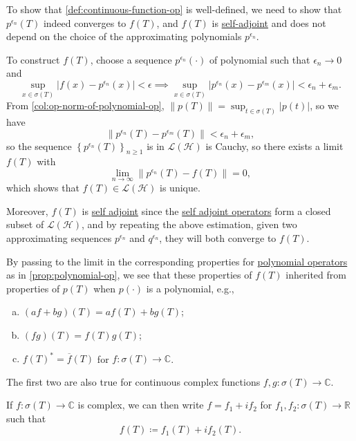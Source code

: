 \begin{note}
	To show that \autoref{def:continuous-function-op} is well-defined, we need to show that \(p^{\epsilon _n}(T)\) indeed converges to \(f(T)\), and \(f(T)\) is \hyperref[def:self-adjoint-op]{self-adjoint} and does not depend on the choice of the approximating polynomials \(p^{\epsilon _n}\).
\end{note}
\begin{explanation}
	To construct \(f(T)\), choose a sequence \(p^{\epsilon _n}(\cdot)\) of polynomial such that \(\epsilon _n \to 0\) and
	\[
		\sup _{x\in \sigma (T)} \vert f(x) - p^{\epsilon _n}(x)  \vert < \epsilon
		\implies \sup _{x\in \sigma (T)} \vert p^{\epsilon _n}(x) - p^{\epsilon _m}(x) \vert < \epsilon _n + \epsilon _m.
	\]
	From \autoref{col:op-norm-of-polynomial-op}, \(\lVert p(T) \rVert = \sup _{t\in \sigma (T)} \vert p(t) \vert \), so we have
	\[
		\lVert p^{\epsilon _n}(T) - p^{\epsilon _m}(T) \rVert < \epsilon _n + \epsilon _m,
	\]
	so the sequence \(\left\{ p^{\epsilon _n}(T) \right\} _{n\geq 1}\) is in \(\mathcal{L} (\mathcal{H} )\) is Cauchy, so there exists a limit \(f(T)\) with
	\[
		\lim_{n \to \infty} \lVert p^{\epsilon _n}(T) - f(T) \rVert = 0,
	\]
	which shows that \(f(T)\in \mathcal{L} (\mathcal{H} )\) is unique.

	Moreover, \(f(T)\) is \hyperref[def:self-adjoint-op]{self adjoint} since the \hyperref[def:self-adjoint-op]{self adjoint operators} form a closed subset of \(\mathcal{L} (\mathcal{H} )\), and by repeating the above estimation, given two approximating sequences \(p^{\epsilon _n}\) and \(q^{\epsilon _n}\), they will both converge to \(f(T)\).
\end{explanation}

By passing to the limit in the corresponding properties for \hyperref[def:polynomial-op]{polynomial operators} as in \autoref{prop:polynomial-op}, we see that these properties of \(f(T)\) inherited from properties of \(p(T)\) when \(p(\cdot)\) is a polynomial, e.g.,
\begin{enumerate}[(a)]
	\item \((af + bg)(T) = af(T) + bg(T)\);
	\item \((fg)(T) = f(T) g(T)\);
	\item \(f(T)^{\ast} = \overline{f} (T)\) for \(f\colon \sigma (T) \to \mathbb{C}\).
\end{enumerate}

\begin{note}
	The first two are also true for continuous complex functions \(f, g\colon \sigma (T) \to \mathbb{C} \).
\end{note}
\begin{explanation}
	If \(f\colon \sigma (T) \to  \mathbb{C} \) is complex, we can then write \(f = f_1 + if_2\) for \(f_1, f_2 \colon \sigma (T) \to \mathbb{R} \) such that
	\[
		f(T) \coloneqq f_1(T) + if_2(T).
	\]
\end{explanation}

